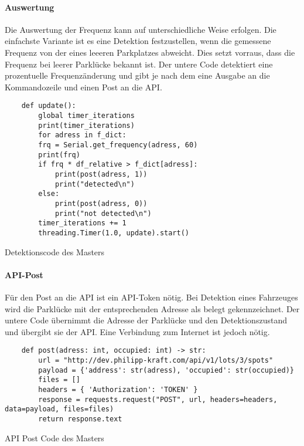 \paragraph{Auswertung}\mbox{} 

Die Auswertung der Frequenz kann auf unterschiedliche Weise erfolgen. Die einfachste Variante ist es eine Detektion festzustellen, wenn die gemessene Frequenz von der eines leeeren Parkplatzes abweicht. Dies setzt vorraus, dass die Frequenz bei leerer 
Parklücke bekannt ist. Der untere Code detektiert eine prozentuelle Frequenzänderung und gibt je nach dem eine Ausgabe an die Kommandozeile und einen Post an die API.

\begin{listing}[H]
    \begin{verbatim}
    def update():
        global timer_iterations
        print(timer_iterations)
        for adress in f_dict:
        frq = Serial.get_frequency(adress, 60)
        print(frq)
        if frq * df_relative > f_dict[adress]:
            print(post(adress, 1))
            print("detected\n")
        else:
            print(post(adress, 0))
            print("not detected\n")
        timer_iterations += 1
        threading.Timer(1.0, update).start()
    \end{verbatim}
    \caption{Detektionscode des Masters}
\end{listing}


\paragraph{API-Post}

Für den Post an die API ist ein API-Token nötig. Bei Detektion eines Fahrzeuges wird die Parklücke mit der entsprechenden Adresse als belegt gekennzeichnet. Der untere Code übernimmt die Adresse der Parklücke und den Detektionszustand und übergibt sie der API.
Eine Verbindung zum Internet ist jedoch nötig.

\begin{listing}[H]
    \begin{verbatim}
    def post(adress: int, occupied: int) -> str:
        url = "http://dev.philipp-kraft.com/api/v1/lots/3/spots"
        payload = {'address': str(adress), 'occupied': str(occupied)}
        files = []
        headers = { 'Authorization': 'TOKEN' }
        response = requests.request("POST", url, headers=headers, data=payload, files=files)
        return response.text
    \end{verbatim}
    \caption{API Post Code des Masters}
\end{listing}


